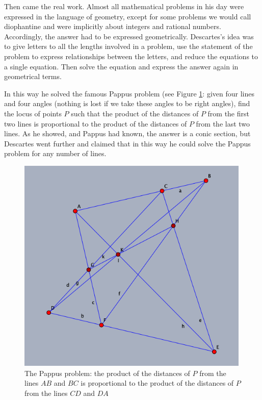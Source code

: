 Then came the real work. Almost all mathematical problems in his day were expressed in the language of geometry, except for some problems we would call diophantine and were implicitly about integers and rational numbers. Accordingly, the answer had to be expressed geometrically. Descartes's idea was to give letters to all the lengths involved in a problem, use the statement of the problem to express relationships between the letters, and reduce the equations to a single equation. Then solve the equation and express the answer again in geometrical terms.  

 In this way he solved the famous Pappus problem (see Figure \ref{figPappusproblem}: given four lines and four angles (nothing is lost if we take these angles to be right angles), find the locus of points $P$ such that the product of the distances of $P$ from the first two lines is proportional to the product of the distances of $P$ from the last two lines. As he showed, and Pappus had known, the answer is a conic section, but  Descartes went further and claimed that in this way he could solve the Pappus problem for any number of lines. 
 
 \bigskip
\begin{center}
    \begin{figure}
   \begin{center}  \includegraphics[width=30em]{Pappuslinefinal.png} 
   \end{center}
     \protect \caption{The Pappus problem: the product of the distances of $P$ from the lines $AB$ and $BC$ is proportional to the product of the distances of $P$ from the lines $CD$ and $DA$}
      \label{figPappusproblem}
     \end{figure}
\end{center}


